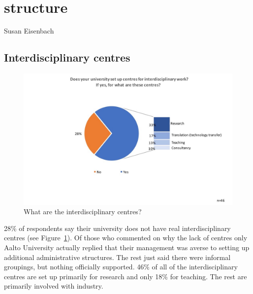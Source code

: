 \newpage
\section{structure}

Susan Eisenbach


\subsection{Interdisciplinary centres}

\begin{figure}[h]
\centering
\includegraphics[width = \linewidth]{charts/5a.jpg}
\caption{What are the interdisciplinary centres?}
\label{sect5:centres}
\end{figure}

28\% of respondents say their university does not have real interdisciplinary centres (see Figure~\ref{sect5:centres}). Of those who commented on why the lack of centres only Aalto University actually replied that their management was averse to setting up additional administrative structures. The rest just said there were informal groupings, but nothing officially supported. 46\% of all of the interdisciplinary centres are set up primarily for research and only 18\% for teaching. The rest are primarily involved with industry.

